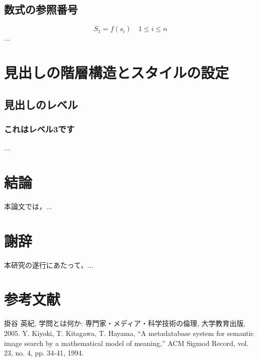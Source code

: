 \documentclass[a4paper,12pt]{report}
\begin{document}
\section{数式の参照番号}
\begin{equation}
    S_1 = f(s_i) \quad 1 \leq i \leq n
\end{equation}
...

\chapter{見出しの階層構造とスタイルの設定}
\section{見出しのレベル}
\subsection{これはレベル3です}
...

\chapter{結論}
本論文では，...

\chapter*{謝辞}
本研究の遂行にあたって，...

\chapter*{参考文献}
\begin{thebibliography}{9}
     掛谷 英紀, 学問とは何か: 専門家・メディア・科学技術の倫理, 大学教育出版, 2005.
     Y. Kiyoki, T. Kitagawa, T. Hayama, ``A metadatabase system for semantic image search by a mathematical model of meaning,'' ACM Sigmod Record, vol. 23, no. 4, pp. 34-41, 1994.
\end{thebibliography}
\end{document}
